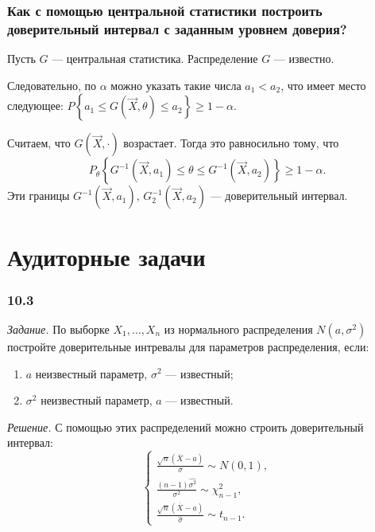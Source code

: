 \subsubsection*{Как с помощью центральной статистики построить доверительный интервал с заданным
                уровнем доверия?}

Пусть $G$ --- центральная статистика.
Распределение $G$ --- известно.

Следовательно, по $ \alpha $ можно указать такие числа $a_1 < a_2$, что имеет место следующее:
$P \left\{ a_1 \leq G \left( \vec{X}, \theta \right) \leq a_2 \right\} \geq
  1 - \alpha $.

Считаем, что $G \left( \vec{X}, \cdot \right) $ возрастает.
Тогда это равносильно тому,
что
$$P_{ \theta } \left\{
    G^{-1} \left( \vec{X}, a_1 \right) \leq \theta \leq G^{-1} \left( \vec{X}, a_2 \right)
  \right\}
  \geq 1 - \alpha.$$
Эти границы $G^{-1} \left( \vec{X}, a_1 \right), \, G_2^{-1} \left( \vec{X}, a_2 \right) $ ---
доверительный интервал.

\section*{Аудиторные задачи}

\subsubsection*{10.3}

\textit{Задание.}
По выборке $X_1, \dotsc, X_n$ из нормального распределения $N \left( a, \sigma^2 \right) $
постройте доверительные интревалы для параметров распределения, если:
\begin{enumerate}[label=\alph*)]
  \item $a$ неизвестный параметр, $ \sigma^2$ --- известный;
  \item $ \sigma^2$ неизвестный параметр, $a$ --- известный.
\end{enumerate}

\textit{Решение.} С помощью этих распределений можно строить доверительный интервал:
$$ \begin{cases}
    \frac{ \sqrt{n} \left( \overline{X} - a \right) }{ \sigma } \sim N \left( 0, 1 \right), \\
    \frac{ \left( n - 1 \right) \hat{ \sigma^2}}{ \sigma^2} \sim \chi_{n - 1}^2, \\
    \frac{ \sqrt{n} \left( \overline{X} - a \right) }{ \hat{ \sigma }} \sim t_{n - 1}.
  \end{cases}$$

